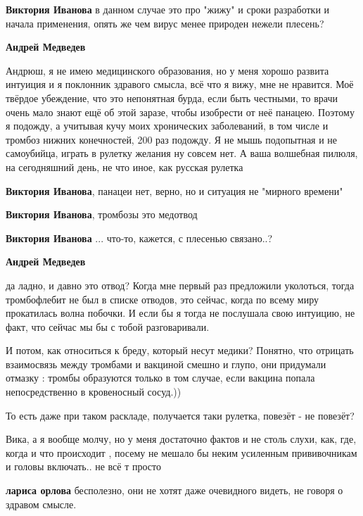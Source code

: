 \begin{itemize}
\begin{itemize}
\textbf{Виктория Иванова} в данном случае это про "жижу" и сроки разработки и начала применения, опять же чем вирус менее природен нежели плесень?

\textbf{Андрей Медведев} 

Андрюш, я не имею медицинского образования, но у меня хорошо развита интуиция и
я поклонник здравого смысла, всё что я вижу, мне не нравится. Моё твёрдое
убеждение, что это непонятная бурда, если быть честными, то врачи очень мало
знают ещё об этой заразе, чтобы изобрести от неё панацею. Поэтому я подожду, а
учитывая кучу моих хронических заболеваний, в том числе и тромбоз нижних
конечностей, 200 раз подожду. Я не мышь подопытная и не самоубийца, играть в
рулетку желания ну совсем нет. А ваша волшебная пилюля, на сегодняшний день, не
что иное, как русская рулетка


\textbf{Виктория Иванова}, панацеи нет, верно, но и ситуация не "мирного времени"

\textbf{Виктория Иванова}, тромбозы это медотвод

\textbf{Виктория Иванова} ... что-то, кажется, с плесенью связано..?

\textbf{Андрей Медведев} 

да ладно, и давно это отвод? Когда мне первый раз предложили уколоться, тогда
тромбофлебит не был в списке отводов, это сейчас, когда по всему миру
прокатилась волна побочки. И если бы я тогда не послушала свою интуицию, не
факт, что сейчас мы бы с тобой разговаривали.

И потом, как относиться к бреду, который несут медики? Понятно, что отрицать
взаимосвязь между тромбами и вакциной смешно и глупо, они придумали отмазку :
тромбы образуются только в том случае, если вакцина попала непосредственно в
кровеносный сосуд.))

То есть даже при таком раскладе, получается таки рулетка, повезёт - не повезёт?

\end{itemize} %


Вика, а я вообще молчу, но у меня достаточно фактов и не столь слухи, как, где,
когда и что происходит , посему не мешало бы неким усиленным прививочникам и
головы включать.. не всё т просто

\begin{itemize} %
\textbf{лариса орлова} бесполезно, они не хотят даже очевидного видеть, не говоря о здравом смысле.


\end{itemize}
\end{itemize}
